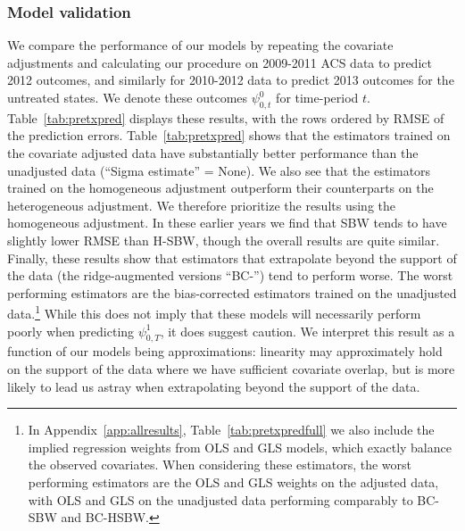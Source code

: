 \documentclass[aoas]{imsart}
\theoremstyle{plain}
\theoremstyle{remark}
\begin{document}
\subsubsection{Model validation}\label{sec:validation}

We compare the performance of our models by repeating the covariate adjustments and calculating our procedure on 2009-2011 ACS data to predict 2012 outcomes, and similarly for 2010-2012 data to predict 2013 outcomes for the untreated states. We denote these outcomes $\psi^0_{0, t}$ for time-period $t$. Table~\ref{tab:pretxpred} displays these results, with the rows ordered by RMSE of the prediction errors. Table~\ref{tab:pretxpred} shows that the estimators trained on the covariate adjusted data have substantially better performance than the unadjusted data (``Sigma estimate'' = None). We also see that the estimators trained on the homogeneous adjustment outperform their counterparts on the heterogeneous adjustment. We therefore prioritize the results using the homogeneous adjustment. In these earlier years we find that SBW tends to have slightly lower RMSE than H-SBW, though the overall results are quite similar. Finally, these results show that estimators that extrapolate beyond the support of the data (the ridge-augmented versions ``BC-'') tend to perform worse. The worst performing estimators are the bias-corrected estimators trained on the unadjusted data.\footnote{In Appendix~\ref{app:allresults}, Table~\ref{tab:pretxpredfull} we also include the implied regression weights from OLS and GLS models, which exactly balance the observed covariates. When considering these estimators, the worst performing estimators are the OLS and GLS weights on the adjusted data, with OLS and GLS on the unadjusted data performing comparably to BC-SBW and BC-HSBW.} While this does not imply that these models will necessarily perform poorly when predicting $\psi^1_{0, T}$, it does suggest caution. We interpret this result as a function of our models being approximations: linearity may approximately hold on the support of the data where we have sufficient covariate overlap, but is more likely to lead us astray when extrapolating beyond the support of the data.
\end{document}
